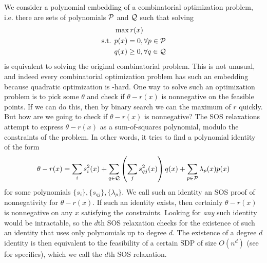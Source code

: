 We consider a polynomial embedding of a combinatorial optimization problem, i.e. there are sets of polynomials $\mathcal P$ and $\mathcal Q$ such that solving
\begin{align*}
&\max r(x) \\
\text{s.t. } &p(x) = 0, \forall p \in \mathcal P \\
&q(x) \geq 0, \forall q \in \mathcal Q
\end{align*}
is equivalent to solving the original combinatorial problem. This is not unusual, and indeed every combinatorial optimization problem has such an embedding because quadratic optimization is \np-hard. One way to solve such an optimization problem is to pick some $\theta$ and check if $\theta - r(x)$ is nonnegative on the feasible points. If we can do this, then by binary search we can the maximum of $r$ quickly. But how are we going to check if $\theta - r(x)$ is nonnegative? The SOS relaxations attempt to express $\theta - r(x)$ as a sum-of-squares polynomial, modulo the constraints of the problem. In other words, it tries to find a polynomial identity of the form
\[\theta - r(x) = \sum_i s_i^2(x) + \sum_{q \in \mathcal Q} \left(\sum_j s_{qj}^2(x)\right)q(x) + \sum_{p\in\mathcal P} \lambda_p(x)p(x)\label{eq:intro_sos_proof}\]
for some polynomials $\{s_i\}, \{s_{qj}\}, \{\lambda_p\}$. 
We call such an identity an SOS proof of nonnegativity for $\theta - r(x)$.
If such an identity exists, then certainly $\theta - r(x)$ is nonnegative on any $x$ satisfying the constraints. Looking for \emph{any} such identity would be intractable, so the $d$th SOS relaxation checks for the existence of such an identity that uses only polynomials up to degree $d$. The existence of a degree $d$ identity is then equivalent to the feasibility of a certain SDP of size $O(n^d)$ (see  for specifics), which we call the $d$th SOS relaxation.


